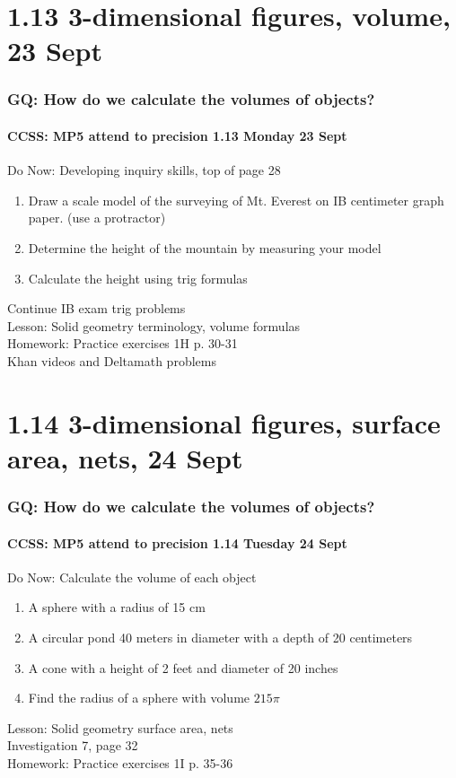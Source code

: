 \documentclass{beamer}
\begin{document}
  \section{1.13 3-dimensional figures, volume, 23 Sept}
  \frame
  {
    \frametitle{GQ: How do we calculate the volumes of objects?}
    \framesubtitle{CCSS: MP5 attend to precision \hfill \alert{1.13 Monday 23 Sept}}

    \begin{block}{Do Now: Developing inquiry skills, top of page 28}
      \begin{enumerate}
          \item Draw a scale model of the surveying of Mt. Everest on IB centimeter graph paper. (use a protractor)
          \item Determine the height of the mountain by measuring your model
          \item Calculate the height using trig formulas
      \end{enumerate}
      \end{block}
  
    Continue IB exam trig problems \\ \bigskip
    Lesson: Solid geometry terminology, volume formulas\\ \smallskip
    Homework: Practice exercises 1H p. 30-31 \\
    Khan videos and Deltamath problems
  }

  \section{1.14 3-dimensional figures, surface area, nets, 24 Sept}
  \frame
  {
    \frametitle{GQ: How do we calculate the volumes of objects?}
    \framesubtitle{CCSS: MP5 attend to precision \hfill \alert{1.14 Tuesday 24 Sept}}

    \begin{block}{Do Now: Calculate the volume of each object}
      \begin{enumerate}
          \item A sphere with a radius of 15 cm
          \item A circular pond 40 meters in diameter with a depth of 20 centimeters
          \item A cone with a height of 2 feet and diameter of 20 inches
          \item Find the radius of a sphere with volume $215 \pi$
      \end{enumerate}
      \end{block}
    Lesson: Solid geometry surface area, nets\\ \smallskip
    Investigation 7, page 32 \\ \bigskip
    Homework: Practice exercises 1I p. 35-36
  }
\end{document}
